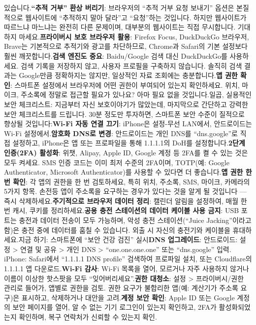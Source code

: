 있습니다.\textbf{“추적 거부” 환상 버리기}: 브라우저의 “추적 거부 요청 보내기” 옵션은 본질적으로 웹사이트에 “추적하지 말아 달라”고 “요청”하는 것입니다. 하지만 웹사이트가 따르느냐 마느냐는 완전히 다른 문제이며, 대부분의 웹사이트는 직접 무시합니다. 기대하지 마세요.\textbf{프라이버시 보호 브라우저 활용}: Firefox Focus, DuckDuckGo 브라우저, Brave는 기본적으로 추적기와 광고를 차단하므로, Chrome과 Safari의 기본 설정보다 훨씬 깨끗합니다.\textbf{검색 엔진도 중요}: Baidu/Google 검색 대신 DuckDuckGo를 사용하세요. 검색 기록을 저장하지 않고, 사용자 프로필을 구축하지 않습니다. 솔직히 검색 결과는 Google만큼 정확하지는 않지만, 일상적인 자료 조회에는 충분합니다.\textbf{앱 권한 확인}: 스마트폰 설정에서 브라우저에 어떤 권한이 부여되어 있는지 확인하세요. 위치, 마이크, 주소록에 정말로 접근할 필요가 있나요? 아마 필요 없을 것입니다.일곱, 실용적인 보안 체크리스트: 지금부터 자신 보호이야기가 많았는데, 마지막으로 간단하고 강력한 보안 체크리스트를 드립니다. 30분 정도만 투자하면, 스마트폰 보안 수준이 질적으로 향상될 것입니다:\textbf{Wi-Fi 자동 연결 끄기}: iPhone은 설정-무선 LAN에서, 안드로이드는 Wi-Fi 설정에서.\textbf{암호화 DNS로 변경}: 안드로이드는 개인 DNS를 “dns.google”로 직접 설정하고, iPhone은 앱 또는 프로파일을 통해 1.1.1.1의 DoH를 설정합니다.\textbf{2단계 인증(2FA) 활성화}: 위챗, Alipay, Apple ID, Google 계정 등 2FA를 켤 수 있는 것은 모두 켜세요. SMS 인증 코드는 이미 최저 수준의 2FA이며, TOTP(예: Google Authenticator, Microsoft Authenticator)를 사용할 수 있다면 더 좋습니다.\textbf{앱 권한 한 번 확인}: 각 앱의 권한을 한 번 검토하세요, 특히 위치, 주소록, SMS, 마이크, 카메라의 5가지 항목. 손전등 앱이 주소록을 요구하는 경우가 있다는 것을 알게 될 것입니다 — 즉시 삭제하세요.\textbf{주기적으로 브라우저 데이터 정리}: 캘린더 알림을 설정하여, 매월 한 번 캐시, 쿠키를 정리하세요.\textbf{공용 충전 스테이션의 데이터 케이블 사용 금지}: USB 포트는 충전과 데이터 전송이 모두 가능하며, 악성 충전 스테이션(“Juice Jacking”이라고 함)은 충전 중에 데이터를 훔칠 수 있습니다. 외출 시 자신의 충전기와 케이블을 휴대하세요.지금 하기: 스마트폰에 “보안 건강 검진” 실시\textbf{DNS 업그레이드}: 안드로이드: 설정 > 연결 및 공유 > 개인 DNS > “one.one.one.one” 또는 “dns.google” 입력. iPhone: Safari에서 “1.1.1.1 DNS profile” 검색하여 프로파일 설치, 또는 Cloudflare의 1.1.1.1 앱 다운로드.\textbf{Wi-Fi 감사}: Wi-Fi 목록을 열어, 모르거나 자주 사용하지 않거나 이름이 이상한 핫스팟을 모두 “잊어버리세요”.\textbf{권한 대청소}: 설정 > 프라이버시/권한 관리로 들어가, 앱별로 권한을 검토. 권한 요구가 불합리한 앱(예: 계산기가 주소록 요구)은 표시하고, 삭제하거나 대안을 고려.\textbf{계정 보안 확인}: Apple ID 또는 Google 계정의 보안 페이지를 열어, 알 수 없는 기기 로그인이 있는지 확인하고, 2FA가 활성화되었는지 확인하며, 복구 연락처가 신뢰할 수 있는지 확인.
